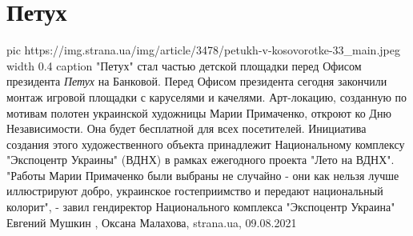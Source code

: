  
 
 
 
 
\chapter{Петух}
\label{sec:slova.petuh}

\ifcmt
  pic https://img.strana.ua/img/article/3478/petukh-v-kosovorotke-33_main.jpeg
  width 0.4
	caption "Петух" стал частью детской площадки перед Офисом президента 
\fi
\emph{Петух} на Банковой.  Перед Офисом президента сегодня закончили монтаж игровой
площадки с каруселями и качелями. Арт-локацию, созданную по мотивам полотен
украинской художницы Марии Примаченко, откроют ко Дню Независимости. Она будет
бесплатной для всех посетителей.  Инициатива создания этого художественного
объекта принадлежит Национальному комплексу "Экспоцентр Украины" (ВДНХ) в
рамках ежегодного проекта "Лето на ВДНХ".  "Работы Марии Примаченко были
выбраны не случайно - они как нельзя лучше иллюстрируют добро, украинское
гостеприимство и передают национальный колорит", - завил гендиректор
Национального комплекса "Экспоцентр Украина" Евгений Мушкин
, 
Оксана Малахова, strana.ua, 09.08.2021
